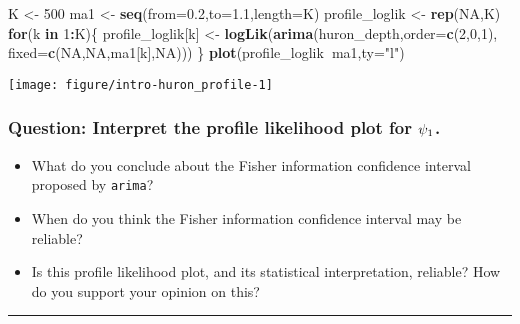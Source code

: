 \documentclass[]{article}
\newenvironment{Shaded}{\begin{snugshade}}{\end{snugshade}}
\newcommand{\KeywordTok}[1]{\textcolor[rgb]{0.13,0.29,0.53}{\textbf{#1}}}
\newcommand{\DataTypeTok}[1]{\textcolor[rgb]{0.13,0.29,0.53}{#1}}
\newcommand{\DecValTok}[1]{\textcolor[rgb]{0.00,0.00,0.81}{#1}}
\newcommand{\FloatTok}[1]{\textcolor[rgb]{0.00,0.00,0.81}{#1}}
\newcommand{\StringTok}[1]{\textcolor[rgb]{0.31,0.60,0.02}{#1}}
\newcommand{\OtherTok}[1]{\textcolor[rgb]{0.56,0.35,0.01}{#1}}
\newcommand{\ControlFlowTok}[1]{\textcolor[rgb]{0.13,0.29,0.53}{\textbf{#1}}}
\newcommand{\OperatorTok}[1]{\textcolor[rgb]{0.81,0.36,0.00}{\textbf{#1}}}
\newcommand{\NormalTok}[1]{#1}
\begin{document}
\begin{Shaded}
\begin{Highlighting}[]
\NormalTok{K <-}\StringTok{ }\DecValTok{500}
\NormalTok{ma1 <-}\StringTok{ }\KeywordTok{seq}\NormalTok{(}\DataTypeTok{from=}\FloatTok{0.2}\NormalTok{,}\DataTypeTok{to=}\FloatTok{1.1}\NormalTok{,}\DataTypeTok{length=}\NormalTok{K)}
\NormalTok{profile_loglik <-}\StringTok{ }\KeywordTok{rep}\NormalTok{(}\OtherTok{NA}\NormalTok{,K)}
\ControlFlowTok{for}\NormalTok{(k }\ControlFlowTok{in} \DecValTok{1}\OperatorTok{:}\NormalTok{K)\{}
\NormalTok{   profile_loglik[k] <-}\StringTok{ }\KeywordTok{logLik}\NormalTok{(}\KeywordTok{arima}\NormalTok{(huron_depth,}\DataTypeTok{order=}\KeywordTok{c}\NormalTok{(}\DecValTok{2}\NormalTok{,}\DecValTok{0}\NormalTok{,}\DecValTok{1}\NormalTok{),}
      \DataTypeTok{fixed=}\KeywordTok{c}\NormalTok{(}\OtherTok{NA}\NormalTok{,}\OtherTok{NA}\NormalTok{,ma1[k],}\OtherTok{NA}\NormalTok{)))}
\NormalTok{\}}
\KeywordTok{plot}\NormalTok{(profile_loglik}\OperatorTok{~}\NormalTok{ma1,}\DataTypeTok{ty=}\StringTok{"l"}\NormalTok{)}
\end{Highlighting}
\end{Shaded}

\begin{center}\texttt{[image: figure/intro-huron\_profile-1]} \end{center}

\subsubsection{\texorpdfstring{Question: Interpret the profile
likelihood plot for
\(\psi_1\).}{Question: Interpret the profile likelihood plot for \textbackslash{}ma\_1.}}\label{question-interpret-the-profile-likelihood-plot-for-ma_1.}

\begin{itemize}
\item
  What do you conclude about the Fisher information confidence interval
  proposed by \texttt{arima}?
\item
  When do you think the Fisher information confidence interval may be
  reliable?
\item
  Is this profile likelihood plot, and its statistical interpretation,
  reliable? How do you support your opinion on this?
\end{itemize}

\begin{center}\rule{0.5\linewidth}{\linethickness}\end{center}
\end{document}
